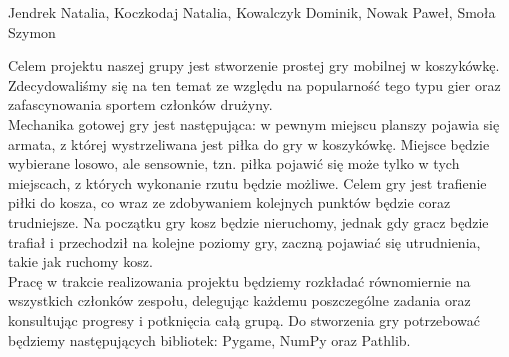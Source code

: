 \documentclass{article}
\begin{document}
\begin{center}
\large Jendrek Natalia, Koczkodaj Natalia, Kowalczyk Dominik, Nowak Paweł, Smoła Szymon \\
\end{center}

\bigskip

\large Celem projektu naszej grupy jest stworzenie prostej gry mobilnej w koszykówkę. Zdecydowaliśmy się na ten temat ze względu na popularność tego typu gier oraz zafascynowania sportem członków drużyny.\\

\smallskip
Mechanika gotowej gry jest następująca: w pewnym miejscu planszy pojawia się armata, z której wystrzeliwana jest piłka do gry w koszykówkę. Miejsce będzie wybierane losowo, ale sensownie, tzn. piłka pojawić się może tylko w tych miejscach, z których wykonanie rzutu będzie możliwe. Celem gry jest trafienie piłki do kosza, co wraz ze zdobywaniem kolejnych punktów będzie coraz trudniejsze. Na początku gry kosz będzie nieruchomy, jednak gdy gracz będzie trafiał i przechodził na kolejne poziomy gry, zaczną pojawiać się utrudnienia, takie jak ruchomy kosz.\\

\smallskip
\large Pracę w trakcie realizowania projektu będziemy rozkładać równomiernie na wszystkich członków zespołu, delegując każdemu poszczególne zadania oraz konsultując progresy i potknięcia całą grupą. Do stworzenia gry potrzebować będziemy następujących bibliotek: Pygame, NumPy oraz Pathlib.
\end{document}
